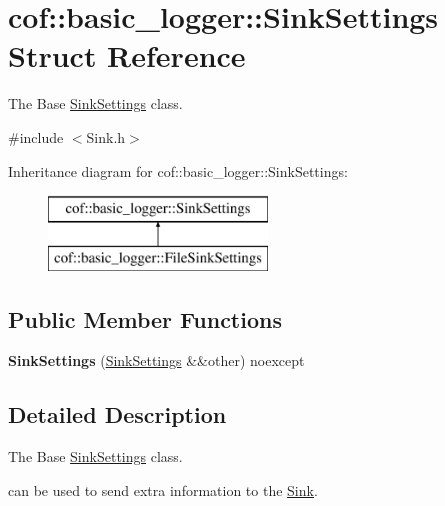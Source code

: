 \hypertarget{structcof_1_1basic__logger_1_1_sink_settings}{}\section{cof\+:\+:basic\+\_\+logger\+:\+:Sink\+Settings Struct Reference}
\label{structcof_1_1basic__logger_1_1_sink_settings}


The Base \hyperlink{structcof_1_1basic__logger_1_1_sink_settings}{Sink\+Settings} class.  




{\ttfamily \#include $<$Sink.\+h$>$}

Inheritance diagram for cof\+:\+:basic\+\_\+logger\+:\+:Sink\+Settings\+:\begin{figure}[H]
\begin{center}
\leavevmode
\includegraphics[height=2.000000cm]{structcof_1_1basic__logger_1_1_sink_settings}
\end{center}
\end{figure}
\subsection*{Public Member Functions}
\begin{DoxyCompactItemize}
\item 
\mbox{\label{structcof_1_1basic__logger_1_1_sink_settings_a34768fcf9b8f2057c2a6c19c5d6aa002}} 
{\bfseries Sink\+Settings} (\hyperlink{structcof_1_1basic__logger_1_1_sink_settings}{Sink\+Settings} \&\&other) noexcept
\end{DoxyCompactItemize}


\subsection{Detailed Description}
The Base \hyperlink{structcof_1_1basic__logger_1_1_sink_settings}{Sink\+Settings} class. 

can be used to send extra information to the \hyperlink{classcof_1_1basic__logger_1_1_sink}{Sink}.

